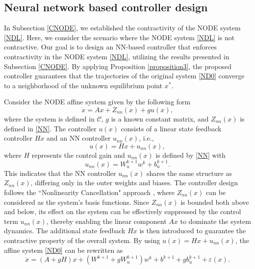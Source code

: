 \documentclass[journal,twoside,web]{ieeecolor}
\newcommand{\hyblue}[1]{{\color{blue}{#1}}}
\begin{document}
\subsection{Neural network based controller design}
In Subsection \ref{CNODE}, we established the contractivity of the NODE system \eqref{NDL}. Here, we consider the scenario where the NODE system \eqref{NDL} is not contractive. Our goal is to design an NN-based controller that enforces contractivity in the NODE system \eqref{NDL}, utilizing the results presented in Subsection \ref{CNODE}. By applying Proposition \ref{proposition3}, the proposed controller guarantees that the trajectories of the original system \eqref{ND0} converge to a neighborhood of the unknown equilibrium point $x^*$.

Consider the NODE affine system given by the following form
\begin{equation}\label{NNC}
  \dot{x}=Ax+Z_{nn}(x)+gu(x),
\end{equation}
where the system is defined in $\mathcal{C}$, $g$ is a known constant matrix, and $Z_{nn}(x)$ is defined in \eqref{NN}. The controller $u(x)$ consists of a linear state feedback controller $Hx$ and an NN controller $u_{nn}(x)$, i.e., 
\begin{equation}\label{NNC10}
u(x)=Hx+u_{nn}(x),
\end{equation}
where $H$ represents the control gain and $u_{nn}(x)$ is defined by \eqref{NN} with 
\begin{equation}\label{NNC1}
u_{nn}(x)=W_u^{k+1}w^k+b_u^{k+1}. 
\end{equation}
This indicates that the NN controller $u_{nn}(x)$ shares the same structure as $Z_{nn}(x)$, differing only in the outer weights and biases. The controller design follows the ``Nonlinearity Cancellation" approach \cite{de2023learning}, where $Z_{nn}(x)$ can be considered as the system's basis functions. Since $Z_{nn}(x)$ is bounded both above and below, its effect on the system can be effectively suppressed by the control term $u_{nn}(x)$, thereby enabling the linear component $Ax$ to dominate the system dynamics. The additional state feedback $Hx$ is then introduced to guarantee the contractive property of the overall system.
By using $u(x)=Hx+u_{nn}(x)$, the affine system \eqref{ND0} can be rewritten as  
\begin{equation}\label{NNC2}
  \dot{x}=(A+gH)x+(W^{k+1}+gW_u^{k+1})w^k+b^{k+1}+gb_u^{k+1}+\varepsilon(x).
\end{equation}
\end{document}
